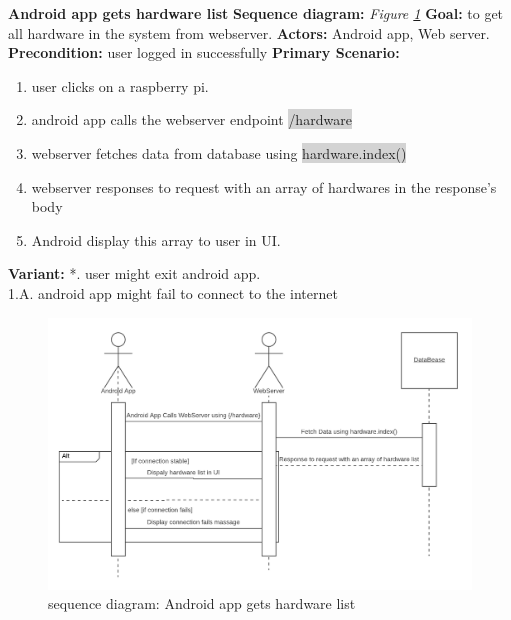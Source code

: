 \documentclass[12pt, oneside, a4paper]{book}
\newcommand{\code}[1]{{\color{red}\colorbox{lightgray}{#1}}}
\newcommand\boldcolor[1]{\textcolor{bold}{\textbf{#1}}}
\begin{document}
				\newpage\hspace*{-6mm}\boldcolor{Android app gets hardware list}
				\newline\textbf{Sequence diagram:} \textit{Figure \ref{android_hw}}
				\newline\textbf{Goal:} to get all hardware in the system from webserver.
				\newline\textbf{Actors:} Android app, Web server.
				\newline\textbf{Precondition:} user logged in successfully
				\newline\textbf{Primary Scenario:}	
				\begin{enumerate}[label*=\arabic*.]
					\item user clicks on a raspberry pi.
					\item android app calls the webserver endpoint \code{/hardware}
					\item webserver fetches data from database using \code{hardware.index()}
					\item webserver responses to request with an array of hardwares in the response's body
					\item Android display this array to user in UI.
				\end{enumerate}
				\textbf{Variant:}\newline
				\hspace*{5mm}*. user might exit android app. \\
				\hspace*{5mm}1.A. android app might fail to connect to the internet \\
				\begin{figure}[H]
					\includegraphics[width=\linewidth]{img/sequence_android_hw.png}
					\caption{sequence diagram: Android app gets hardware list}
					\label{android_hw}
				\end{figure}
\end{document}
